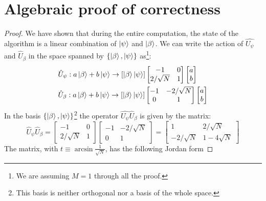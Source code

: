 \section{Algebraic proof of correctness}
\begin{proof}
We have shown that during the entire computation, the state of the algorithm is a linear combination of $\ket{\psi}$ and $\ket{\beta}$. We can write the action of $\hat{U_\psi}$ and $\hat{U}_\beta$ in the space spanned by $\{\ket{\beta}, \ket{\psi}\}$ as\footnote{We are assuming $M=1$ through all the proof.}:
\begin{align*}
    &\hat{U}_\psi : a\ket{\beta} + b\ket{\psi} \rightarrow [\ket{\beta}\ket{\psi}] \begin{bmatrix}
    -1 & 0 \\
    2/\sqrt{N} & 1
    \end{bmatrix} 
    \begin{bmatrix}
    a \\
    b
    \end{bmatrix} \\
    &\hat{U}_\beta : a\ket{\beta} + b\ket{\psi} \rightarrow [\ket{\beta}\ket{\psi}] \begin{bmatrix}
    -1 & -2/\sqrt{N} \\
    0 & 1
    \end{bmatrix} 
    \begin{bmatrix}
    a \\
    b
    \end{bmatrix} 
\end{align*}
In the basis $\{\ket{\beta}, \ket{\psi}\}$\footnote{This basis is neither orthogonal nor a basis of the whole space.} the operator $\hat{U_\psi}\hat{U}_\beta$ is given by the matrix:
\begin{equation*}
    \hat{U}_\psi\hat{U}_\beta = \begin{bmatrix}
    -1 & 0 \\
    2/\sqrt{N} & 1
    \end{bmatrix} 
    \begin{bmatrix}
    -1 & -2/\sqrt{N} \\
    0 & 1
    \end{bmatrix}  =
    \begin{bmatrix}
    1 & 2/\sqrt{N} \\
    -2/\sqrt{N} & 1-4\sqrt{N}
    \end{bmatrix} 
\end{equation*}
The matrix, with $t\equiv \arcsin{\frac{1}{\sqrt{N}}}$, has the following Jordan form

\end{proof}
